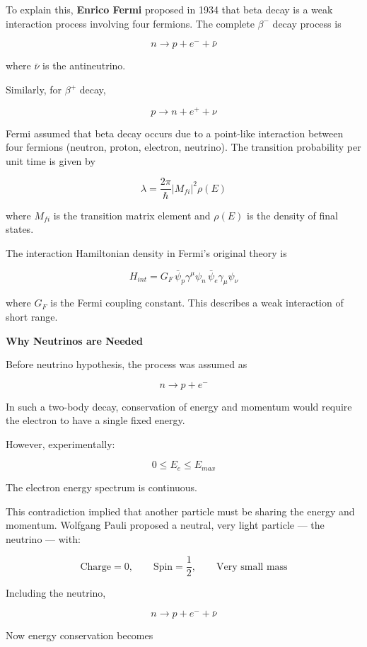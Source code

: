 \documentclass[a4paper, 12pt]{article}
\begin{document}
To explain this, \textbf{Enrico Fermi} proposed in 1934 that beta decay is a weak interaction process involving four fermions. 
The complete $\beta^{-}$ decay process is

\[
n \rightarrow p + e^{-} + \bar{\nu}
\]

where $\bar{\nu}$ is the antineutrino.

Similarly, for $\beta^{+}$ decay,

\[
p \rightarrow n + e^{+} + \nu
\]

Fermi assumed that beta decay occurs due to a point-like interaction between four fermions (neutron, proton, electron, neutrino). 
The transition probability per unit time is given by

\[
\lambda = \frac{2\pi}{\hbar} |M_{fi}|^2 \rho(E)
\]

where $M_{fi}$ is the transition matrix element and $\rho(E)$ is the density of final states.

The interaction Hamiltonian density in Fermi's original theory is

\[
H_{int} = G_F \, \bar{\psi}_p \gamma^\mu \psi_n \, 
\bar{\psi}_e \gamma_\mu \psi_\nu
\]

where $G_F$ is the Fermi coupling constant. 
This describes a weak interaction of short range.

\vspace{0.4cm}

\textbf{Why Neutrinos are Needed}

Before neutrino hypothesis, the process was assumed as

\[
n \rightarrow p + e^{-}
\]

In such a two-body decay, conservation of energy and momentum would require the electron to have a single fixed energy.

However, experimentally:

\[
0 \leq E_e \leq E_{max}
\]

The electron energy spectrum is continuous.

This contradiction implied that another particle must be sharing the energy and momentum. 
Wolfgang Pauli proposed a neutral, very light particle — the neutrino — with:

\[
\text{Charge} = 0, \qquad \text{Spin} = \frac{1}{2}, \qquad \text{Very small mass}
\]

Including the neutrino,

\[
n \rightarrow p + e^{-} + \bar{\nu}
\]

Now energy conservation becomes
\end{document}
